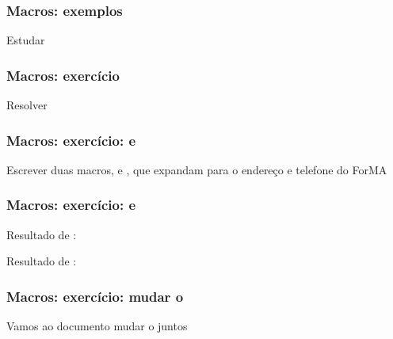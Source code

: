 \begin{frame}
  \frametitle{Macros: exemplos}
  \huge
  Estudar 
\end{frame}

\begin{frame}
  \frametitle{Macros: exercício}
  \huge
  Resolver 
\end{frame}

\begin{frame}
  \frametitle{Macros: exercício: \latexcode{\address} e \latexcode{\telephone}}
  \LARGE
  Escrever duas macros, \latexcode{\address} e \latexcode{\telephone}, que
  expandam para o endereço e telefone do ForMA
\end{frame}

\begin{frame}
  \frametitle{Macros: exercício: \latexcode{\email} e \latexcode{\todo}}
  \LARGE
  Resultado de \latexcode{\email}: 
  \vspace{1em}

  Resultado de \latexcode{\todo}: 
\end{frame}

\begin{frame}
  \frametitle{Macros: exercício: mudar o \latexcode{\maketitle}}
  \LARGE
  Vamos ao documento mudar o \latexcode{\maketitle} juntos
\end{frame}
